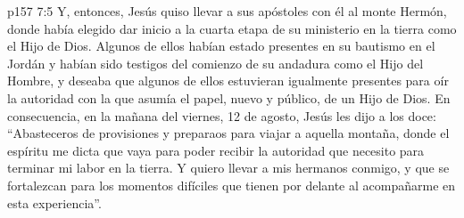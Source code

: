 \vs p157 7:5 \pc Y, entonces, Jesús quiso llevar a sus apóstoles con él al monte Hermón, donde había elegido dar inicio a la cuarta etapa de su ministerio en la tierra como el Hijo de Dios. Algunos de ellos habían estado presentes en su bautismo en el Jordán y habían sido testigos del comienzo de su andadura como el Hijo del Hombre, y deseaba que algunos de ellos estuvieran igualmente presentes para oír la autoridad con la que asumía el papel, nuevo y público, de un Hijo de Dios. En consecuencia, en la mañana del viernes, 12 de agosto, Jesús les dijo a los doce: “Abasteceros de provisiones y preparaos para viajar a aquella montaña, donde el espíritu me dicta que vaya para poder recibir la autoridad que necesito para terminar mi labor en la tierra. Y quiero llevar a mis hermanos conmigo, y que se fortalezcan para los momentos difíciles que tienen por delante al acompañarme en esta experiencia”.
